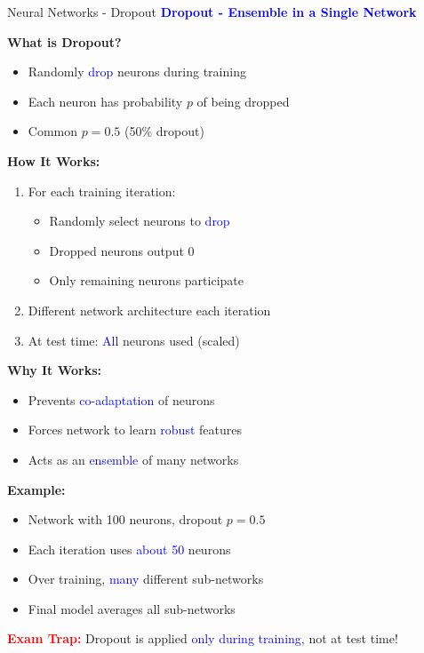 \documentclass[8pt]{beamer}
\begin{document}
	\begin{frame}{Neural Networks - Dropout}
		\fontsize{6.5}{7.5}\selectfont
		\textcolor{blue}{\textbf{Dropout - Ensemble in a Single Network}}
		
		\textbf{What is Dropout?}
		\begin{itemize}
			\item Randomly \textcolor{blue}{drop} neurons during training
			\item Each neuron has probability $p$ of being dropped
			\item Common $p = 0.5$ (50\% dropout)
		\end{itemize}
		
		\textbf{How It Works:}
		\begin{enumerate}
			\item For each training iteration:
			\begin{itemize}
				\item Randomly select neurons to \textcolor{blue}{drop}
				\item Dropped neurons output 0
				\item Only remaining neurons participate
			\end{itemize}
			\item Different network architecture each iteration
			\item At test time: \textcolor{blue}{All} neurons used (scaled)
		\end{enumerate}
		
		\textbf{Why It Works:}
		\begin{itemize}
			\item Prevents \textcolor{blue}{co-adaptation} of neurons
			\item Forces network to learn \textcolor{blue}{robust} features
			\item Acts as an \textcolor{blue}{ensemble} of many networks
		\end{itemize}
		
		\textbf{Example:}
		\begin{itemize}
			\item Network with 100 neurons, dropout $p = 0.5$
			\item Each iteration uses \textcolor{blue}{about 50} neurons
			\item Over training, \textcolor{blue}{many} different sub-networks
			\item Final model averages all sub-networks
		\end{itemize}
		
		\textcolor{red}{\textbf{Exam Trap:}} Dropout is applied \textcolor{blue}{only during training}, not at test time!
	\end{frame}
	
\end{document}

